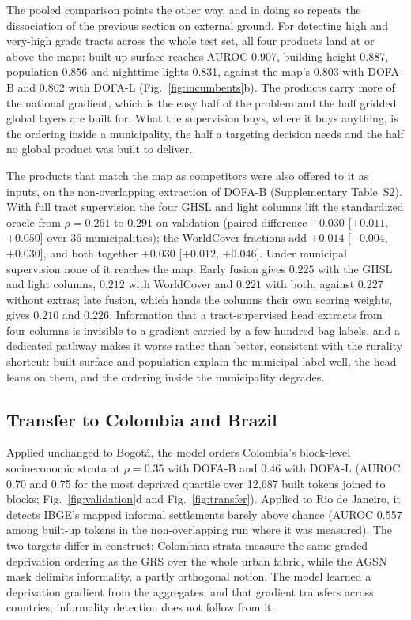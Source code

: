 \documentclass[11pt]{article}
\begin{document}


The pooled comparison points the other way, and in doing so repeats the dissociation of
the previous section on external ground. For detecting high and very-high grade tracts
across the whole test set, all four products land at or above the maps: built-up
surface reaches AUROC 0.907, building height 0.887, population 0.856 and nighttime
lights 0.831, against the map's 0.803 with DOFA-B and 0.802 with DOFA-L
(Fig.~\ref{fig:incumbents}b). The products carry more of the national gradient, which
is the easy half of the problem and the half gridded global layers are built for. What
the supervision buys, where it buys anything, is the ordering inside a municipality, the
half a targeting decision needs and the half no global product was built to deliver.

The products that match the map as competitors were also offered to it as inputs, on
the non-overlapping extraction of DOFA-B (Supplementary Table~S2). With full tract
supervision the four GHSL and light columns lift the standardized oracle from
$\rho = 0.261$ to $0.291$ on validation (paired difference $+0.030$ [$+0.011$,
$+0.050$] over 36 municipalities); the WorldCover fractions add $+0.014$ [$-0.004$,
$+0.030$], and both together $+0.030$ [$+0.012$, $+0.046$]. Under municipal supervision
none of it reaches the map. Early fusion gives $0.225$ with the GHSL and light columns,
$0.212$ with WorldCover and $0.221$ with both, against $0.227$ without extras; late
fusion, which hands the columns their own scoring weights, gives $0.210$ and $0.226$.
Information that a tract-supervised head extracts from four columns is invisible to a
gradient carried by a few hundred bag labels, and a dedicated pathway makes it worse
rather than better, consistent with the rurality shortcut: built surface and
population explain the municipal label well, the head leans on them, and the ordering
inside the municipality degrades.

\subsection{Transfer to Colombia and Brazil}

Applied unchanged to Bogot\'a, the model orders Colombia's block-level socioeconomic
strata at $\rho = 0.35$ with DOFA-B and $0.46$ with DOFA-L (AUROC 0.70 and 0.75 for
the most deprived quartile over 12{,}687 built tokens joined to blocks;
Fig.~\ref{fig:validation}d and Fig.~\ref{fig:transfer}). Applied to Rio de Janeiro, it
detects IBGE's mapped informal settlements barely above chance (AUROC 0.557 among
built-up tokens in the non-overlapping run where it was measured). The two targets
differ in construct: Colombian strata measure the same graded deprivation ordering as
the GRS over the whole urban fabric, while the AGSN mask delimits informality, a partly
orthogonal notion. The model learned a deprivation gradient from the aggregates, and
that gradient transfers across countries; informality detection does not follow from
it.
\end{document}
